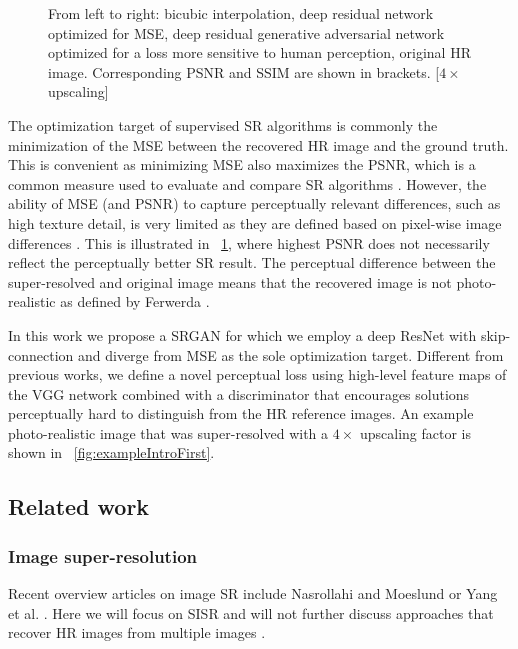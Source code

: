 \documentclass[10pt,twocolumn,letterpaper]{article}
\begin{document}
\begin{figure}[ht]
\begin{tabular}{cccc}
  	\end{tabular}
	\caption{From left to right: bicubic interpolation, deep residual network optimized for MSE, deep residual generative adversarial network optimized for a loss more sensitive to human perception, original HR image. Corresponding PSNR and SSIM are shown in brackets. [$4\times$ upscaling]} 
	\label{fig:exampleIntro}
\end{figure}
%
	The optimization target of supervised \ac{SR} algorithms is commonly the minimization of the \ac{MSE} between the recovered \ac{HR} image and the ground truth. This is convenient as minimizing \ac{MSE} also maximizes the \ac{PSNR}, which is a common measure used to evaluate and compare \ac{SR} algorithms \cite{Yang14benchmark}.
	 However, the ability of MSE (and PSNR) to capture perceptually relevant differences, such as high texture detail, is very limited as they are defined based on pixel-wise image differences \cite{Wang2003,Wang2004,Gupta2011}. This is illustrated in \figurename~\ref{fig:exampleIntro}, where highest PSNR does not necessarily reflect the perceptually better \ac{SR} result. The perceptual difference between the super-resolved and original image means that the recovered image is not photo-realistic as defined by Ferwerda \cite{Ferwerda2003}. 
	
	
	In this work we propose a \ac{SRGAN} for which we employ a deep \ac{ResNet} with skip-connection and diverge from \ac{MSE} as the sole optimization target. Different from previous works, we define a novel perceptual loss using high-level feature maps of the VGG network \cite{simonyan2014very,Johnson16PercepLoss,bruna2016super} combined with a discriminator that encourages solutions perceptually hard to distinguish from the \ac{HR} reference images. 
	An example photo-realistic image that was super-resolved with a $4\times$ upscaling factor is shown in \figurename~\ref{fig:exampleIntroFirst}.
	
\subsection{Related work}
\subsubsection{Image super-resolution}
	Recent overview articles on image \ac{SR} include Nasrollahi and Moeslund \cite{Nasrollahi2014} or Yang et al. \cite{Yang14benchmark}. Here we will focus on \ac{SISR} and will not further discuss approaches that recover \ac{HR} images from multiple images \cite{Borman1998aSurvey,Farsiu2004}.
	
\end{document}

